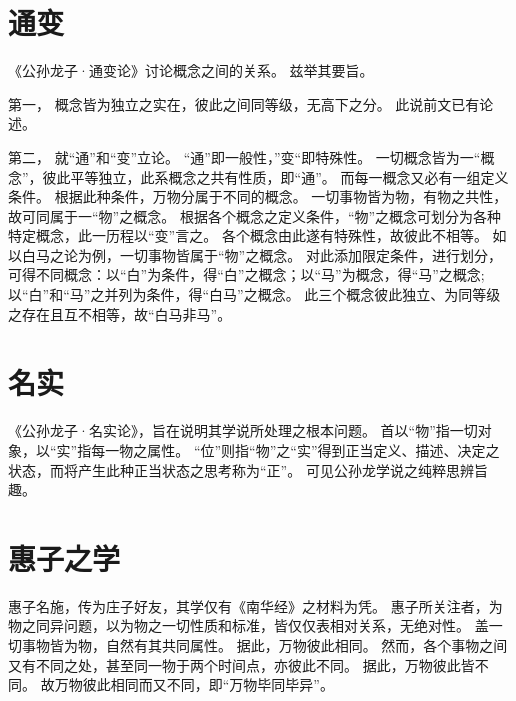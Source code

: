 \documentclass[11pt]{article}
\begin{document}
\section{通变}
《公孙龙子·通变论》讨论概念之间的关系。
兹举其要旨。

\newline

第一， 概念皆为独立之实在，彼此之间同等级，无高下之分。
此说前文已有论述。

\newline

第二， 就“通”和“变”立论。
“通”即一般性，”变“即特殊性。
一切概念皆为一“概念”，彼此平等独立，此系概念之共有性质，即“通”。
而每一概念又必有一组定义条件。
根据此种条件，万物分属于不同的概念。
一切事物皆为物，有物之共性，故可同属于一“物”之概念。
根据各个概念之定义条件，“物”之概念可划分为各种特定概念，此一历程以“变”言之。
各个概念由此遂有特殊性，故彼此不相等。
如以白马之论为例，一切事物皆属于“物”之概念。
对此添加限定条件，进行划分，可得不同概念：以“白”为条件，得“白”之概念；以“马”为概念，得“马”之概念;以“白”和“马”之并列为条件，得“白马”之概念。
此三个概念彼此独立、为同等级之存在且互不相等，故“白马非马”。

\section{名实}
《公孙龙子·名实论》，旨在说明其学说所处理之根本问题。
首以“物”指一切对象，以“实”指每一物之属性。
“位”则指“物”之“实”得到正当定义、描述、决定之状态，而将产生此种正当状态之思考称为“正”。
可见公孙龙学说之纯粹思辨旨趣。

\section{惠子之学}
惠子名施，传为庄子好友，其学仅有《南华经》之材料为凭。
惠子所关注者，为物之同异问题，以为物之一切性质和标准，皆仅仅表相对关系，无绝对性。
盖一切事物皆为物，自然有其共同属性。
据此，万物彼此相同。
然而，各个事物之间又有不同之处，甚至同一物于两个时间点，亦彼此不同。
据此，万物彼此皆不同。
故万物彼此相同而又不同，即“万物毕同毕异”。
  
\end{document}
